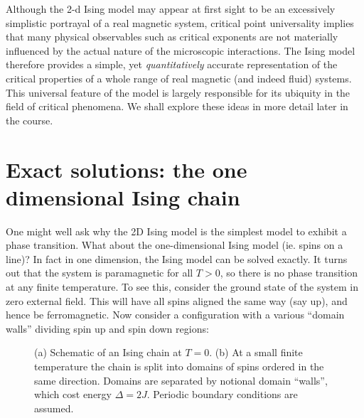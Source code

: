 \documentclass[
  letterpaper,
  enabledeprecatedfontcommands]{report}
\begin{document}
Although the 2-d Ising model may appear at first sight to be an
excessively simplistic portrayal of a real magnetic system, critical
point universality implies that many physical observables such as
critical exponents are not materially influenced by the actual nature of
the microscopic interactions. The Ising model therefore provides a
simple, yet \emph{quantitatively} accurate representation of the
critical properties of a whole range of real magnetic (and indeed fluid)
systems. This universal feature of the model is largely responsible for
its ubiquity in the field of critical phenomena. We shall explore these
ideas in more detail later in the course.

\section{Exact solutions: the one dimensional Ising
chain}\label{exact-solutions-the-one-dimensional-ising-chain}

One might well ask why the 2D Ising model is the simplest model to
exhibit a phase transition. What about the one-dimensional Ising model
(ie. spins on a line)? In fact in one dimension, the Ising model can be
solved exactly. It turns out that the system is paramagnetic for all
\(T>0\), so there is no phase transition at any finite temperature. To
see this, consider the ground state of the system in zero external
field. This will have all spins aligned the same way (say up), and hence
be ferromagnetic. Now consider a configuration with a various ``domain
walls'' dividing spin up and spin down regions:

\begin{figure}


\caption{\label{fig-isingchain}(a) Schematic of an Ising chain at
\(T=0\). (b) At a small finite temperature the chain is split into
domains of spins ordered in the same direction. Domains are separated by
notional domain ``walls'', which cost energy \(\Delta=2J\). Periodic
boundary conditions are assumed.}

\end{figure}%
\end{document}

